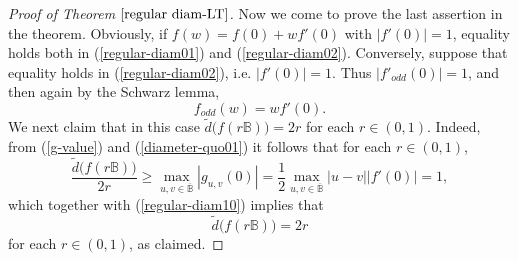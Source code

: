 \documentclass{amsart}
\theoremstyle{definition}
\theoremstyle{remark}
\numberwithin{equation}{section}
\begin{document}
\begin{proof}[Proof of Theorem $\ref{regular diam-LT}$]
Now we come to prove the last assertion in the theorem. Obviously, if $f(w)=f(0)+wf'(0)$ with $|f'(0)|=1$,  equality holds both in (\ref{regular-diam01}) and (\ref{regular-diam02}). Conversely, suppose that equality holds in (\ref{regular-diam02}), i.e. $|f'(0)|=1$. Thus $|f'_{odd}(0)|=1$, and then again by the Schwarz lemma,
$$f_{odd}(w)=wf'(0).$$
We next claim that in this case $\widetilde{d}\big(f(r\mathbb B)\big)=2r$
for each $r\in(0, 1)$. Indeed, from (\ref{g-value}) and (\ref{diameter-quo01}) it follows that for each $r\in(0, 1)$,
$$\frac{\widetilde{d}\big(f(r\mathbb B)\big)}{2r}\geq
\max_{u,v\in \overline{\mathbb B}}|g_{u,v}(0)|=\frac12 \max_{u,v\in \overline{\mathbb B}}|u-v||f'(0)|=1,$$
which together with (\ref{regular-diam10}) implies that
$$\widetilde{d}\big(f(r\mathbb B)\big)=2r$$
for each $r\in(0, 1)$, as claimed.


\end{proof}
\end{document}

